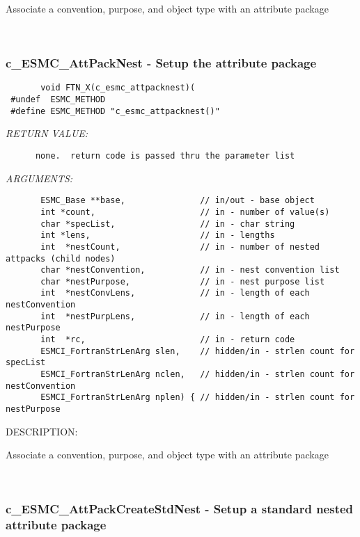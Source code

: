        Associate a convention, purpose, and object type with an attribute package
   
 
\mbox{}\hrulefill\ 
 
\subsubsection [c\_ESMC\_AttPackNest] {c\_ESMC\_AttPackNest - Setup the attribute package}


  
\begin{verbatim}       void FTN_X(c_esmc_attpacknest)(
 #undef  ESMC_METHOD
 #define ESMC_METHOD "c_esmc_attpacknest()"\end{verbatim}{\em RETURN VALUE:}
\begin{verbatim}      none.  return code is passed thru the parameter list
   \end{verbatim}{\em ARGUMENTS:}
\begin{verbatim}       ESMC_Base **base,               // in/out - base object
       int *count,                     // in - number of value(s)
       char *specList,                 // in - char string
       int *lens,                      // in - lengths
       int  *nestCount,                // in - number of nested attpacks (child nodes)
       char *nestConvention,           // in - nest convention list
       char *nestPurpose,              // in - nest purpose list
       int  *nestConvLens,             // in - length of each nestConvention
       int  *nestPurpLens,             // in - length of each nestPurpose
       int  *rc,                       // in - return code
       ESMCI_FortranStrLenArg slen,    // hidden/in - strlen count for specList
       ESMCI_FortranStrLenArg nclen,   // hidden/in - strlen count for nestConvention
       ESMCI_FortranStrLenArg nplen) { // hidden/in - strlen count for nestPurpose
   \end{verbatim}
{\sf DESCRIPTION:\\ }


       Associate a convention, purpose, and object type with an attribute package
   
 
\mbox{}\hrulefill\ 
 
\subsubsection [c\_ESMC\_AttPackCreateStdNest] {c\_ESMC\_AttPackCreateStdNest - Setup a standard nested attribute package}


